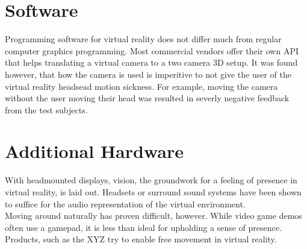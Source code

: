 \documentclass[11pt]{report}
\begin{document}
\section{Software}
	Programming software for virtual reality does not differ much from regular computer graphics programming. Most commercial vendors offer their own API that helps translating a virtual camera to a two camera 3D setup. It was found however, that how the camera is used is imperitive to not give the user of the virtual reality headsead motion sickness. For example, moving the camera without the user moving their head was resulted in severly negative feedback from the test subjects.
	
\section{Additional Hardware}
With headmounted displays, vision, the groundwork for a feeling of presence in virtual reality, is laid out. Headsets or surround sound systems have been shown to suffice for the audio representation of the virtual environment.\\
Moving around naturally has proven difficult, however. While video game demos often use a gamepad, it is less than ideal for upholding a sense of presence. Products, such as the XYZ try to enable free movement in virtual reality.



	
	
	
	
\end{document}

